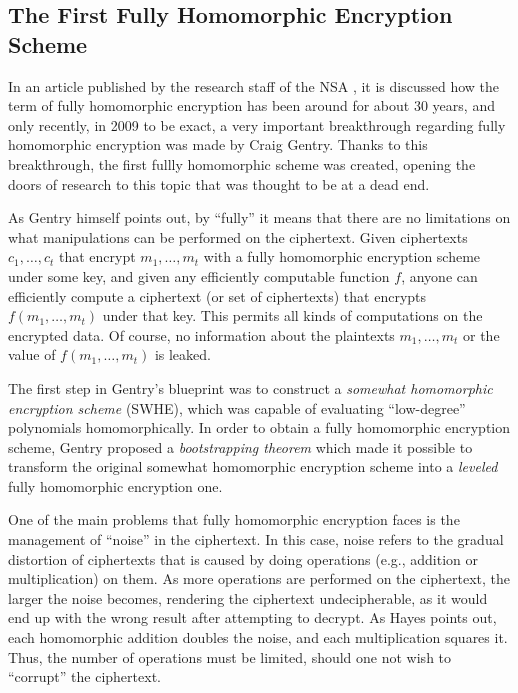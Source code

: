 \subsection{The First Fully Homomorphic Encryption Scheme}

In an article published by the research staff of the NSA \cite{NSA2014}, it is discussed how the term of fully homomorphic encryption has been around for about 30 years, and only recently, in 2009 to be exact, a very important breakthrough regarding fully homomorphic encryption was made by Craig Gentry. Thanks to this breakthrough, the first fullly homomorphic scheme was created, opening the doors of research to this topic that was thought to be at a dead end. 

As Gentry \cite{homoenc} himself points out, by ``fully'' it means that there are no limitations on what manipulations can be performed on the ciphertext. Given ciphertexts $c_{1}, \dots, c_{t}$ that encrypt $m_{1}, \dots, m_{t}$ with a fully homomorphic encryption scheme under some key, and given any efficiently computable function $f$, anyone can efficiently compute a ciphertext (or set of ciphertexts) that encrypts $f(m_{1}, \dots, m_{t})$ under that key. This permits all kinds of computations on the encrypted data. Of course, no information about the plaintexts $m_{1}, \dots, m_{t}$ or the value of $f(m_{1}, \dots, m_{t})$ is leaked. 

The first step in Gentry's blueprint was to construct a \emph{somewhat homomorphic encryption scheme} (SWHE), which was capable of evaluating ``low-degree'' polynomials homomorphically. In order to obtain a fully homomorphic encryption scheme, Gentry proposed a \emph{bootstrapping theorem} which made it possible to transform the original somewhat homomorphic encryption scheme into a \emph{leveled} fully homomorphic encryption one.

One of the main problems that fully homomorphic encryption faces is the management of ``noise'' in the ciphertext. In this case, noise refers to the gradual distortion of ciphertexts that is caused by doing operations (e.g., addition or multiplication) on them. As more operations are performed on the ciphertext, the larger the noise becomes, rendering the ciphertext undecipherable, as it would end up with the wrong result after attempting to decrypt. As Hayes \cite{Hayes2012} points out, each homomorphic addition doubles the noise, and each multiplication squares it. Thus, the number of operations must be limited, should one not wish to ``corrupt'' the ciphertext. 

